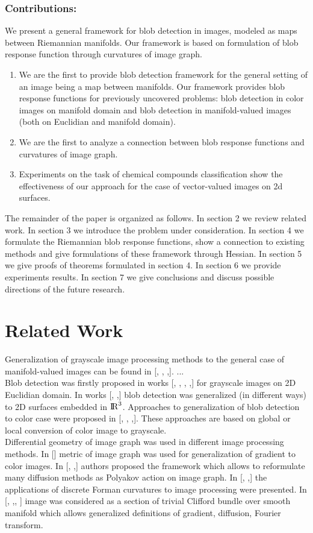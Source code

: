 \documentclass{llncs}
\begin{document}
\subsubsection{Contributions:}
We present a general framework for blob detection in images, modeled as maps between Riemannian manifolds. Our framework is based on formulation of blob response function through curvatures of image graph.
\begin{enumerate}
\item We are the first to provide blob detection framework for the general setting of an image being a map between manifolds. Our framework provides blob response functions for previously uncovered problems: blob detection in color images on manifold domain and blob detection in manifold-valued images (both on Euclidian and manifold domain). 
\item We are the first to analyze a connection between blob response functions and curvatures of image graph.
\item Experiments on the task of chemical compounds classification show the effectiveness of our approach for the case of vector-valued images on 2d surfaces.  
\end{enumerate}

The remainder of the paper is organized as follows. In section 2 we review related work. In section 3 we introduce the problem under consideration. In section 4 we formulate the Riemannian blob response functions, show a connection to existing methods and give formulations of these framework through Hessian. In section 5 we give proofs of theorems formulated in section 4. In section 6 we provide experiments results. In section 7 we give conclusions and discuss possible directions of the future research.

\section{Related Work}
Generalization of grayscale image processing methods to the general case of manifold-valued images can be found in [, , ,]. ...
\\
Blob detection was firstly proposed in works [, , , ,] for grayscale images on 2D Euclidian domain. In works [, ,] blob detection was generalized (in different ways) to 2D surfaces embedded in ${\rm I\!R}^3$. Approaches to generalization of blob detection to color case were proposed in [, , ,]. These approaches are based on global or local conversion of color image to grayscale.
\\
Differential geometry of image graph was used in different image processing methods. In [] metric of image graph was used for generalization of gradient to color images. In [, ,] authors proposed the framework which allows to reformulate many diffusion methods as Polyakov action on image graph. In [, ,] the applications of discrete Forman curvatures to image processing were presented. In [, ,, ] image was considered as a section of trivial Clifford bundle over smooth manifold which allows generalized definitions of gradient, diffusion, Fourier transform.
\end{document}
